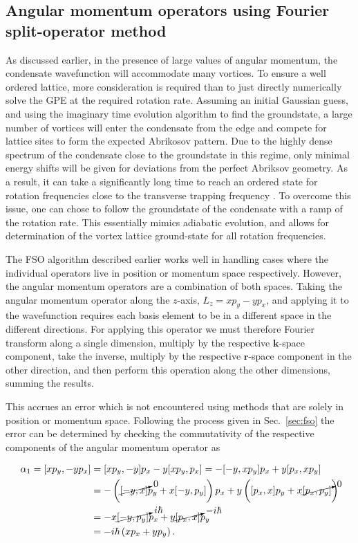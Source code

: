 \subsection{Angular momentum operators using Fourier split-operator  method}\label{ss:ang_mom_fso}
As discussed earlier, in the presence of large values of angular momentum, the condensate wavefunction will accommodate many vortices. To ensure a well ordered lattice, more consideration is required than to just directly numerically solve the GPE at the required rotation rate. Assuming an initial Gaussian guess, and using the imaginary time evolution algorithm to find the groundstate, a large number of vortices will enter the condensate from the edge and compete for lattice sites to form the expected Abrikosov pattern. Due to the highly dense spectrum of the condensate close to the groundstate in this regime, only minimal energy shifts will be given for deviations from the perfect Abriksov geometry. As a result, it can take a significantly long time to reach an ordered state for rotation frequencies close to the transverse trapping frequency \cite{Vtx:Mueller_prl_2002}. To overcome this issue, one can chose to follow the groundstate of the condensate with a ramp of the rotation rate. This essentially mimics adiabatic evolution, and allows for determination of the vortex lattice ground-state for all rotation frequencies.

The FSO algorithm described earlier works well in handling cases where the individual operators live in position or momentum space respectively. However, the angular momentum operators are a combination of both spaces. Taking the angular momentum operator along the $z$-axis, $L_z = xp_y - yp_x$, and applying it to the wavefunction requires each basis element to be in a different space in the different directions. For applying this operator we must therefore Fourier transform along a single dimension, multiply by the respective $\mathbf{k}$-space component, take the inverse, multiply by the respective $\mathbf{r}$-space component in the other direction, and then perform this operation along the other dimensions, summing the results.

This accrues an error which is not encountered using methods that are solely in position or momentum space. Following the process given in Sec.~\ref{sec:fso} the error can be determined by checking the commutativity of the respective components of the angular momentum operator as

 \begin{subequations}
 \begin{align}
 	\alpha_1 = [x p_y,-y p_x] &= [x p_y,-y] p_x  -  y[x p_y,p_x] = -[-y,x p_y] p_x + y [p_x, x p_y] \nonumber \\
 		&= -\left( {\cancelto{0}{[-y,x]}} p_y + x [-y,p_y] \right) p_x + y \left( [p_x,x] p_y + x {\cancelto{0}{[p_x,p_y]}} \right) \nonumber \\
 		&= -x {\cancelto{i\hbar}{[-y, p_y]}} p_x + y {\cancelto{-i\hbar}{[p_x,x]}} p_y \nonumber \\
        &= -i\hbar \left(x p_x + y p_y \right).
 \end{align}
\end{subequations}


